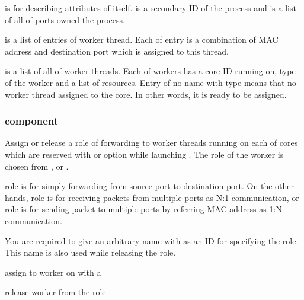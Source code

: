 \documentclass[a4paper,11pt,openany,oneside,english]{sphinxmanual}
\begin{document}
 is for describing attributes of  itself.
 is a secondary ID of the process and  is a list of
all of ports owned the process.

 is a list of entries of  worker thread.
Each of entry is a combination of MAC address and destination port which is
assigned to this thread.

 is a list of all of worker threads. Each of workers has a
core ID running on, type of the worker and a list of resources.
Entry of no name with  type means that no worker thread assigned to
the core. In other words, it is ready to be assigned.


\subsubsection{component}
\label{\detokenize{commands/secondary/spp_vf:component}}\label{\detokenize{commands/secondary/spp_vf:commands-spp-vf-component}}
Assign or release a role of forwarding to worker threads running on each of
cores which are reserved with  or  option while launching
. The role of the worker is chosen from ,  or
.

 role is for simply forwarding from source port to destination port.
On the other hands,  role is for receiving packets from multiple ports
as N:1 communication, or  role is for sending packet to
multiple ports by referring MAC address as 1:N communication.

You are required to give an arbitrary name with as an ID for specifying the role.
This name is also used while releasing the role.

\begin{sphinxVerbatim}[commandchars=\\\{\},formatcom=\footnotesize]
 assign  to worker on  with a 

 release worker  from the role
\end{sphinxVerbatim}
\end{document}

